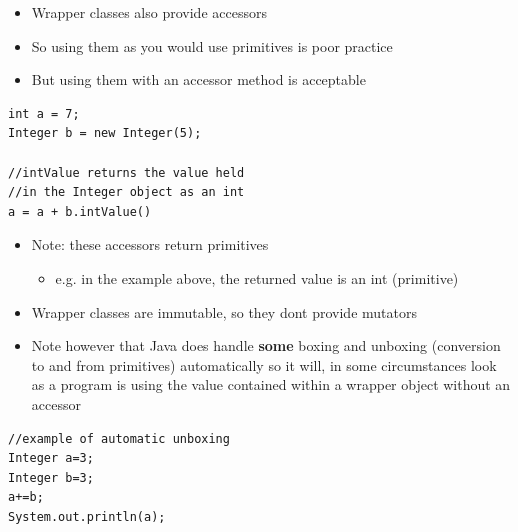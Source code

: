 \documentclass{beamer}
\begin{document}
\begin{frame}[fragile]

\begin{itemize}
\item Wrapper classes also provide accessors
\item So using them as you would use primitives is poor practice
\item But using them with an accessor method is acceptable
\end{itemize}

\begin{block}{}
\begin{lstlisting}
int a = 7;
Integer b = new Integer(5);

//intValue returns the value held 
//in the Integer object as an int
a = a + b.intValue() 

\end{lstlisting}
\end{block}
\begin{itemize}
\item Note: these accessors return primitives
\begin{itemize}
\item e.g. in the example above, the returned value is an int (primitive)
\end{itemize}
\end{itemize}
\end{frame}

\begin{frame}[fragile]
\begin{itemize}
\item Wrapper classes are immutable, so they dont provide mutators
\item Note however that Java does handle \textbf{some} boxing and unboxing (conversion to and from primitives) automatically so it will, in some circumstances look as a program is using the value contained within a wrapper object without an accessor
\end{itemize}

\begin{block}{}
\begin{lstlisting}
//example of automatic unboxing
Integer a=3;
Integer b=3;
a+=b;
System.out.println(a);

\end{lstlisting}
\end{block}
\end{frame}
\end{document}
